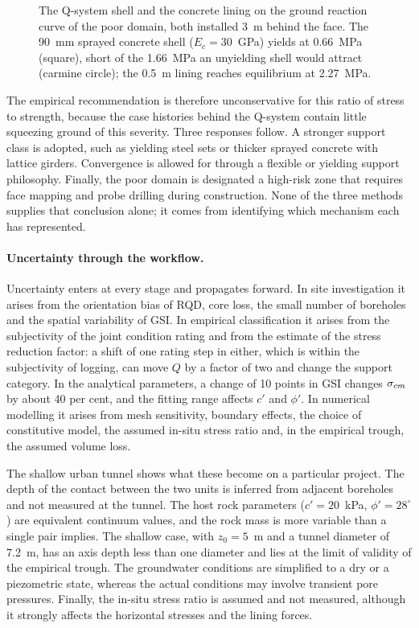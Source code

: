 \begin{figure}[htbp]
\centering
{}
\caption{The Q-system shell and the concrete lining on the ground reaction curve of the poor domain, both installed 3~m behind the face. The 90~mm sprayed concrete shell ($E_c = 30$~GPa) yields at 0.66~MPa (square), short of the 1.66~MPa an unyielding shell would attract (carmine circle); the 0.5~m lining reaches equilibrium at 2.27~MPa.}
\label{fig:empirical-vs-ccm}
\end{figure}

The empirical recommendation is therefore unconservative for this ratio of
stress to strength, because the case histories behind the Q-system contain
little squeezing ground of this severity. Three responses follow. A stronger
support class is adopted, such as yielding steel sets or thicker sprayed concrete
with lattice girders. Convergence is allowed for through a flexible or
yielding support philosophy. Finally, the poor domain is designated a high-risk
zone that requires face mapping and probe drilling during construction. None
of the three methods supplies that conclusion alone; it comes from
identifying which mechanism each has represented.

\paragraph{Uncertainty through the workflow.}
Uncertainty enters at every stage and propagates forward. In site
investigation it arises from the orientation bias of RQD, core loss, the
small number of boreholes and the spatial variability of GSI. In empirical
classification it arises from the subjectivity of the joint condition rating
and from the estimate of the stress reduction factor: a shift of one rating
step in either, which is within the subjectivity of logging, can move $Q$ by
a factor of two and change the support category. In the analytical
parameters, a change of 10 points in GSI changes $\sigma_{cm}$ by about 40 per
cent, and the fitting range affects $c'$ and $\phi'$. In numerical modelling
it arises from mesh sensitivity, boundary effects, the choice of constitutive
model, the assumed in-situ stress ratio and, in the empirical trough, the
assumed volume loss.

The shallow urban tunnel shows what these become on a particular project.
The depth of the contact between the two units is inferred from adjacent
boreholes and not measured at the tunnel. The host rock parameters
($c'=20$~kPa, $\phi'=28^\circ$) are equivalent continuum values, and the rock
mass is more variable than a single pair implies. The shallow case, with
$z_0=5$~m and a tunnel diameter of 7.2~m, has an axis depth less than one
diameter and lies at the limit of validity of the empirical trough. The groundwater
conditions are simplified to a dry or a piezometric state, whereas the actual
conditions may involve transient pore pressures. Finally, the in-situ stress
ratio is assumed and not measured, although it strongly affects the
horizontal stresses and the lining forces.

